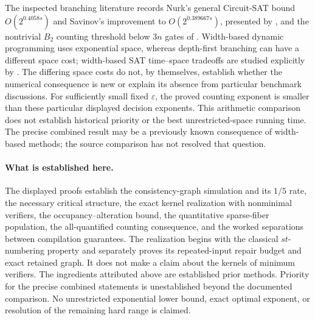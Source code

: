 The inspected branching literature records Nurk's general
Circuit-SAT bound $O(2^{0.4058s})$ \citep{Nurk2009} and Savinov's
improvement to $O(2^{0.389667s})$, presented by
\citet{Lialina2020}, and the nontrivial $B_2$ counting threshold
below $3n$ gates of \citet{GKST2018}. Width-based dynamic programming
uses exponential space, whereas depth-first branching can have a
different space cost; width-based SAT time--space tradeoffs are
studied explicitly by \citet{Allender2014}. The differing space
costs do not, by themselves, establish whether the numerical
consequence is new or explain its absence from particular benchmark
discussions. For sufficiently small fixed $\varepsilon$, the proved
counting exponent is smaller than these particular displayed decision
exponents. This arithmetic comparison does not establish historical
priority or the best unrestricted-space running time. The precise
combined result may be a previously known consequence of width-based
methods; the source comparison has not resolved that question.

\paragraph{What is established here.}
The displayed proofs establish the consistency-graph simulation and
its $1/5$ rate, the necessary critical structure, the exact kernel
realization with nonminimal verifiers, the occupancy--alteration bound,
the quantitative sparse-fiber population, the all-quantified counting
consequence, and the worked separations between compilation
guarantees. The realization begins with the classical $st$-numbering
property and separately proves its repeated-input repair budget and
exact retained graph. It does not make a claim about the kernels of
minimum verifiers. The ingredients attributed above are established prior
methods. Priority for the precise combined statements is unestablished
beyond the documented comparison. No unrestricted exponential lower
bound, exact optimal exponent, or resolution of the remaining hard
range is claimed.
